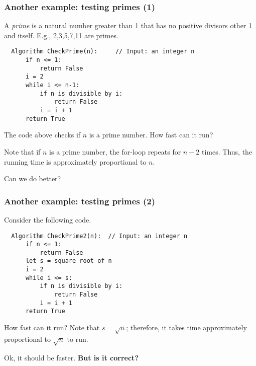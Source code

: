 \begin{frame}[fragile]\frametitle{Another example: testing primes (1)}
  A {\em prime} is a natural number greater than 1 that has no
  positive divisors other 1 and itself.  E.g., 2,3,5,7,11 are primes.
  \pause

  \begin{tcolorbox}
  {\small
\begin{verbatim}
  Algorithm CheckPrime(n):     // Input: an integer n
      if n <= 1:
          return False
      i = 2
      while i <= n-1:
          if n is divisible by i:
              return False
          i = i + 1
      return True
\end{verbatim}
  }
  \end{tcolorbox}
  
  The code above checks if $n$ is a prime number.   How fast can it run?
  \pause

  Note that if $n$ is a prime number, the for-loop repeats for $n-2$
  times.  Thus, the running time is approximately proportional to
  $n$.
  \pause

  Can we do better?
\end{frame}

\begin{frame}[fragile]\frametitle{Another example: testing primes (2)}
  Consider the following code.
  
  \begin{tcolorbox}
  {\small
\begin{verbatim}
  Algorithm CheckPrime2(n):  // Input: an integer n
      if n <= 1:
          return False
      let s = square root of n
      i = 2
      while i <= s:
          if n is divisible by i:
              return False
          i = i + 1
      return True
\end{verbatim}
  }
  \end{tcolorbox}
  
  How fast can it run? \pause Note that $s = \sqrt{n}$; therefore, it
  takes time approximately proportional to $\sqrt{n}$ to run.
  \pause

  Ok, it should be faster.  {\bf But is it correct?}

\end{frame}

